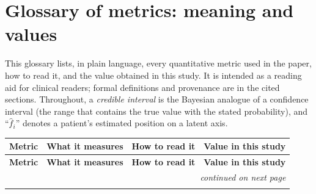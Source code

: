 \section{Glossary of metrics: meaning and values}
\label{ann:metrics}

This glossary lists, in plain language, every quantitative metric used in the paper, how to
read it, and the value obtained in this study. It is intended as a reading aid for clinical
readers; formal definitions and provenance are in the cited sections. Throughout, a
\emph{credible interval} is the Bayesian analogue of a confidence interval (the range that
contains the true value with the stated probability), and ``$\hat f_i$'' denotes a patient's
estimated position on a latent axis.

{\small
\setlength{\tabcolsep}{4pt}
\renewcommand{\arraystretch}{1.15}
\begin{longtable}{@{}p{2.5cm}p{4.2cm}p{3.0cm}p{4.5cm}@{}}
\toprule
\textbf{Metric} & \textbf{What it measures} & \textbf{How to read it} & \textbf{Value in this study} \\
\midrule
\endfirsthead
\toprule
\textbf{Metric} & \textbf{What it measures} & \textbf{How to read it} & \textbf{Value in this study} \\
\midrule
\endhead
\midrule \multicolumn{4}{r}{\footnotesize\itshape continued on next page} \\
\endfoot
\bottomrule
\endlastfoot


\end{longtable}}
